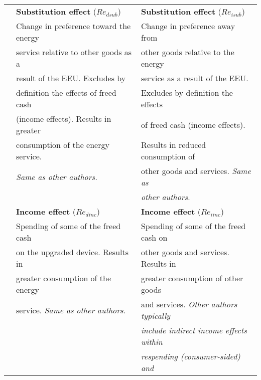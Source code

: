 \begin{table}
\begin{center}
\begin{tabular}{ r l l }
                                   \cmidrule{2-3}
                                   & \textbf{Substitution effect} ($Re_{dsub}$)  & \textbf{Substitution effect} ($Re_{isub}$) \\
                                   & Change in preference toward the energy      & Change in preference away from  \\
                                   & service relative to other goods as a        & other goods relative to the energy  \\
                                   & result of the EEU. Excludes by              & service as a result of the EEU.  \\
                                   & definition the effects of freed cash        & Excludes by definition the effects \\ 
                                   & (income effects). Results in greater        & of freed cash (income effects).     \\ 
                                   & consumption of the energy service.          & Results in reduced consumption of   \\
                                   & \emph{Same as other authors.}               & other goods and services. \emph{Same as} \\
                                   &                                             & \emph{other authors}. \\ 
                                   \cmidrule{2-3}
                                   & \textbf{Income effect} ($Re_{dinc}$)        & \textbf{Income effect} ($Re_{iinc}$) \\
                                   & Spending of some of the freed cash          & Spending of some of the freed cash on  \\
                                   & on the upgraded device. Results in          & other goods and services. Results in \\
                                   & greater consumption of the energy           & greater consumption of other goods  \\ 
                                   & service. \emph{Same as other authors.}      & and services. \emph{Other authors typically} \\
                                   &                                             & \emph{include indirect income effects within} \\
                                   &                                             & \emph{respending (consumer-sided) and} \\

\end{tabular}
\end{center}
\end{table}
